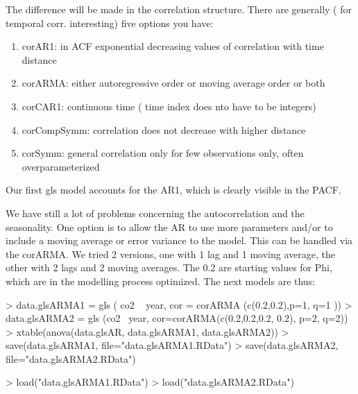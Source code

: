 \documentclass[11pt, a4paper]{article} %
\begin{document}
The difference will be made in the correlation structure. There are generally ( for temporal corr. interesting) five options you have:
\begin{enumerate}
\item corAR1: in ACF exponential decreasing values of correlation with time distance\\
\item corARMA: either autoregressive order or moving average order or both\\
\item corCAR1: continuous time ( time index does nto have to be integers)\\
\item corCompSymm: correlation does not decrease with higher distance\\
\item corSymm: general correlation only for few observations only, often overparameterized\\
\end{enumerate}
Our first gls model accounts for the AR1, which is clearly visible in the PACF.
\begin{Schunk}
\end{Schunk}
We have still a lot of problems concerning the autocorrelation and the seasonality. One option is to allow the AR to use more parameters and/or to include a moving average or error variance to the model. This can be handled via the corARMA. We tried 2 versions, one with 1 lag and 1 moving average, the other with 2 lags and 2 moving averages.
The 0.2 are starting values for Phi, which are in the modelling process optimized.
The next models are thus:
\begin{Schunk}
\begin{Sinput}
> data.glsARMA1 = gls ( co2 ~ year, cor = corARMA (c(0.2,0.2),p=1, q=1 ))
> data.glsARMA2 = gls (co2 ~year, cor=corARMA(c(0.2,0.2,0.2, 0.2), p=2, q=2))
> xtable(anova(data.glsAR, data.glsARMA1, data.glsARMA2))
> save(data.glsARMA1, file="data.glsARMA1.RData")
> save(data.glsARMA2, file="data.glsARMA2.RData")
\end{Sinput}
\end{Schunk}

\begin{Schunk}
\begin{Sinput}
> load("data.glsARMA1.RData")
> load("data.glsARMA2.RData")
\end{Sinput}
\end{Schunk}
\end{document}
